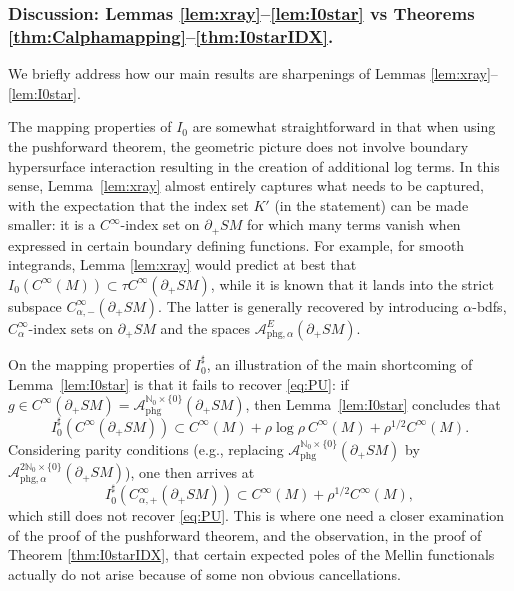 \documentclass[11pt]{article}
\newcommand{\eg}{e.g.,\xspace}
\theoremstyle{plain}
\theoremstyle{definition}
\theoremstyle{remark}
\def\Nm{{\mathbb{N}}}
\def\A{\mathcal{A}}
\newcommand{\adj}{I_0^\sharp}
\newcommand{\phg}{\mathrm{phg}}
\begin{document}
\subsubsection*{Discussion: Lemmas \ref{lem:xray}--\ref{lem:I0star} vs Theorems \ref{thm:Calphamapping}--\ref{thm:I0starIDX}.}

We briefly address how our main results are sharpenings of Lemmas \ref{lem:xray}--\ref{lem:I0star}.

The mapping properties of $I_0$ are somewhat straightforward in that when using the pushforward theorem, the geometric picture does not involve boundary hypersurface interaction resulting in the creation of additional log terms. In this sense, Lemma~\ref{lem:xray} almost entirely captures what needs to be captured, with the expectation that the index set $K'$ (in the statement) can be made smaller: it is a $C^\infty$-index set on $\partial_+ SM$ for which many terms vanish when expressed in certain boundary defining functions. For example, for smooth integrands, Lemma \ref{lem:xray} would predict at best that $I_0 (C^\infty(M))\subset \tau C^\infty(\partial_+ SM)$, while it is known that it lands into the strict subspace $C_{\alpha,-}^\infty(\partial_+ SM)$. The latter is generally recovered by introducing $\alpha$-bdfs, $C_\alpha^\infty$-index sets on $\partial_+ SM$ and the spaces $\A_{\phg,\alpha}^E (\partial_+ SM)$.

On the mapping properties of $\adj$, an illustration of the main shortcoming of Lemma~\ref{lem:I0star} is that it fails to recover \eqref{eq:PU}: if $g\in C^\infty(\partial_+ SM) = \A^{\Nm_0\times \{0\}}_{\phg}(\partial_+ SM)$, then Lemma~\ref{lem:I0star} concludes that
\begin{equation*}
\adj (C^\infty(\partial_+ SM)) \subset C^\infty(M) + \rho\log \rho\ C^\infty(M) + \rho^{1/2} C^\infty(M).
\end{equation*}
Considering parity conditions (\eg replacing $\A^{\Nm_0\times \{0\}}_{\phg}(\partial_+ SM)$ by $\A^{2\Nm_0\times \{0\}}_{\phg,\alpha}(\partial_+ SM)$), one then arrives at
\begin{equation*}
\adj (C_{\alpha,+}^\infty(\partial_+ SM)) \subset C^\infty(M) + \rho^{1/2} C^\infty(M),
\end{equation*}
which still does not recover \eqref{eq:PU}. This is where one need a closer examination of the proof of the pushforward theorem, and the observation, in the proof of Theorem \ref{thm:I0starIDX}, that certain expected poles of the Mellin functionals actually do not arise because of some non obvious cancellations.
\end{document}
